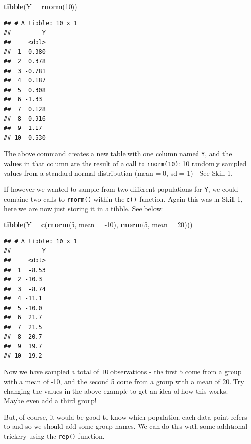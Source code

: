 \documentclass[]{book}
\newenvironment{Shaded}{\begin{snugshade}}{\end{snugshade}}
\newcommand{\DataTypeTok}[1]{\textcolor[rgb]{0.13,0.29,0.53}{#1}}
\newcommand{\DecValTok}[1]{\textcolor[rgb]{0.00,0.00,0.81}{#1}}
\newcommand{\KeywordTok}[1]{\textcolor[rgb]{0.13,0.29,0.53}{\textbf{#1}}}
\newcommand{\NormalTok}[1]{#1}
\begin{document}
\begin{Shaded}
\begin{Highlighting}[]
\KeywordTok{tibble}\NormalTok{(}\DataTypeTok{Y =} \KeywordTok{rnorm}\NormalTok{(}\DecValTok{10}\NormalTok{))}
\end{Highlighting}
\end{Shaded}

\begin{verbatim}
## # A tibble: 10 x 1
##         Y
##     <dbl>
##  1  0.380
##  2  0.378
##  3 -0.781
##  4  0.187
##  5  0.308
##  6 -1.33 
##  7  0.128
##  8  0.916
##  9  1.17 
## 10 -0.630
\end{verbatim}

The above command creates a new table with one column named \texttt{Y}, and the values in that column are the result of a call to \texttt{rnorm(10)}: 10 randomly sampled values from a standard normal distribution (mean = 0, sd = 1) - See Skill 1.

If however we wanted to sample from two different populations for \texttt{Y}, we could combine two calls to \texttt{rnorm()} within the \texttt{c()} function. Again this was in Skill 1, here we are now just storing it in a tibble. See below:

\begin{Shaded}
\begin{Highlighting}[]
\KeywordTok{tibble}\NormalTok{(}\DataTypeTok{Y =} \KeywordTok{c}\NormalTok{(}\KeywordTok{rnorm}\NormalTok{(}\DecValTok{5}\NormalTok{, }\DataTypeTok{mean =} \DecValTok{-10}\NormalTok{), }
             \KeywordTok{rnorm}\NormalTok{(}\DecValTok{5}\NormalTok{, }\DataTypeTok{mean =}  \DecValTok{20}\NormalTok{)))}
\end{Highlighting}
\end{Shaded}

\begin{verbatim}
## # A tibble: 10 x 1
##         Y
##     <dbl>
##  1  -8.53
##  2 -10.3 
##  3  -8.74
##  4 -11.1 
##  5 -10.0 
##  6  21.7 
##  7  21.5 
##  8  20.7 
##  9  19.7 
## 10  19.2
\end{verbatim}

Now we have sampled a total of 10 observations - the first 5 come from a group with a mean of -10, and the second 5 come from a group with a mean of 20. Try changing the values in the above example to get an idea of how this works. Maybe even add a third group!

But, of course, it would be good to know which population each data point refers to and so we should add some group names. We can do this with some additional trickery using the \texttt{rep()} function.
\end{document}
